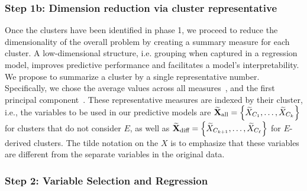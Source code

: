 \subsubsection{Step 1b: Dimension reduction via cluster representative}
Once the clusters have been identified in phase 1, we proceed to reduce the dimensionality of the overall problem by creating a summary measure for each cluster. A low-dimensional structure, i.e. grouping when captured in a regression model, improves predictive performance and facilitates a model's interpretability. 
We propose to summarize a cluster by a single representative number. Specifically, we chose the average values across all measures~\citep{park2007averaged,buhlmann2013correlated}, and the first principal component~\citep{langfelder2007eigengene}.  These representative measures are indexed by their cluster, i.e., the variables
to be used in our predictive models are \mbox{$\widetilde{\mathbf{X}}_{\textrm{{all}}} = \left\lbrace \widetilde{X}_{C_1}, \ldots, \widetilde{X}_{C_k}\right\rbrace$} for clusters that do not consider $E$, as well as  \mbox{$\widetilde{\mathbf{X}}_{\textrm{{diff}}} = \left\lbrace \widetilde{X}_{C_{k+1}}, \ldots, \widetilde{X}_{C_\ell}\right\rbrace$} for $E$-derived clusters. 
The tilde notation on the $X$ is to emphasize that these variables are different from the separate variables in the original data. 


\subsubsection{Step 2: Variable Selection and Regression} \label{sec:varselect}


